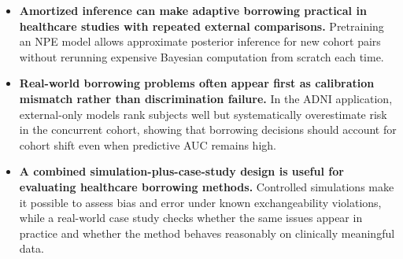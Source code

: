 \begin{itemize}[leftmargin=1.5em, itemsep=2pt]
  \item \textbf{Amortized inference can make adaptive borrowing practical in
        healthcare studies with repeated external comparisons.}
        Pretraining an NPE model allows approximate posterior inference
        for new cohort pairs without rerunning expensive Bayesian computation
        from scratch each time.

  \item \textbf{Real-world borrowing problems often appear first as calibration
        mismatch rather than discrimination failure.}
        In the ADNI application, external-only models rank subjects well but
        systematically overestimate risk in the concurrent cohort, showing that
        borrowing decisions should account for cohort shift even when predictive
        AUC remains high.

  \item \textbf{A combined simulation-plus-case-study design is useful for
        evaluating healthcare borrowing methods.}
        Controlled simulations make it possible to assess bias and error under
        known exchangeability violations, while a real-world case study checks
        whether the same issues appear in practice and whether the method
        behaves reasonably on clinically meaningful data.
\end{itemize}
